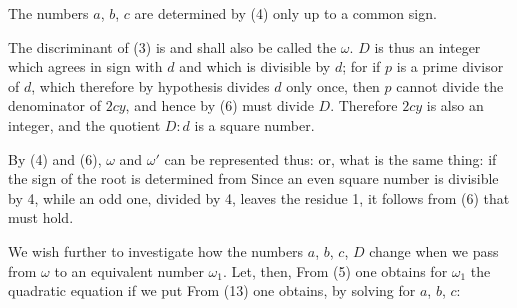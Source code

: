 The numbers $a$, $b$, $c$ are determined by (4) only up to a common sign.

The discriminant of (3) is
and shall also be called the  $\omega$. $D$ is thus an integer which agrees in sign with $d$ and which is divisible by $d$; for if $p$ is a prime divisor of $d$, which therefore by hypothesis divides $d$ only once, then $p$ cannot divide the denominator of $2cy$, and hence by (6) must divide $D$. Therefore $2cy$ is also an integer, and the quotient $D:d$ is a square number.

By (4) and (6), $\omega$ and $\omega'$ can be represented thus:
or, what is the same thing:
if the sign of the root is determined from
Since an even square number is divisible by 4, while an odd one, divided by 4, leaves the residue 1, it follows from (6) that
must hold.

We wish further to investigate how the numbers $a$, $b$, $c$, $D$ change when we pass from $\omega$ to an equivalent number $\omega_1$. Let, then,
From (5) one obtains for $\omega_1$ the quadratic equation
if we put
From (13) one obtains, by solving for $a$, $b$, $c$:

